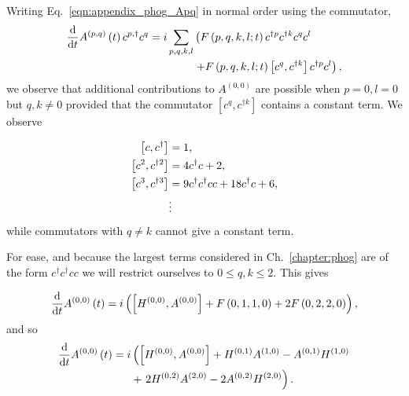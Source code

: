 Writing Eq.~\ref{eqn:appendix_phog_Apq} in normal order using the commutator,
\begin{align}
\frac{\mathrm{d}}{\mathrm{d}t} A^{\left(p, q\right)}\left(t\right) c^{p, \dagger} c^q = i \sum_{p, q, k, l} &\left( F\left( p, q, k, l;t\right) c^{\dagger p} c^{\dagger k} c^q c^l \right. \notag \\
&\left.+ F\left(p, q, k, l;t\right)  \left[ c^{q}, c^{\dagger k}\right] c^{\dagger p} c^l \right),
\end{align}
we observe that additional contributions to $A^{\left(0, 0\right)}$ are possible when $p=0, l=0$ but $q, k \ne 0$ provided that the commutator $\left[ c^q, c^{\dagger k}\right]$ contains a constant term. We observe

\begin{align}\label{eqn:phog_appendix_commutator}
\left[ c, c^\dagger \right] &= 1, \notag \\
%
\left[ c^2, c^{\dagger 2} \right] &= 4 c^\dagger c + 2, \notag \\
%
\left[ c^3, c^{\dagger 3} \right] &= 9 c^\dagger c^\dagger c c + 18 c^\dagger c + 6 ,\notag \\
%
&\vdots
\end{align}
while commutators with $q \ne k$ cannot give a constant term. 

For ease, and because the largest terms considered in Ch.~\ref{chapter:phog} are of the form $c^\dagger c^\dagger c c$ we will restrict ourselves to $0 \le q, k \le 2$. This gives

\begin{equation}
\frac{\mathrm{d}}{\mathrm{d}t} A^{\left(0, 0\right)}\left(t\right) = i \left( \left[ H^{\left(0, 0\right)}, A^{\left(0, 0\right)}\right] + F\left(0, 1, 1, 0\right) + 2 F\left(0, 2, 2, 0\right)\right), \notag
\end{equation}
and so 
\begin{align}\label{eqn:ddt_a00}
\ddt A^{\left(0, 0\right)}\left(t\right) = i  &\left(\left[ H^{\left(0, 0\right)}, A^{\left(0, 0\right)}\right] + H^{\left(0, 1\right)} A^{\left(1, 0\right)} - A^{\left(0, 1\right)} H^{\left(1, 0\right)} \right. \notag \\
%
&+\left. 2 H^{\left(0, 2\right)} A^{\left(2, 0\right)} - 2 A^{\left(0, 2\right)} H^{\left(2, 0\right)} \right).
\end{align}

